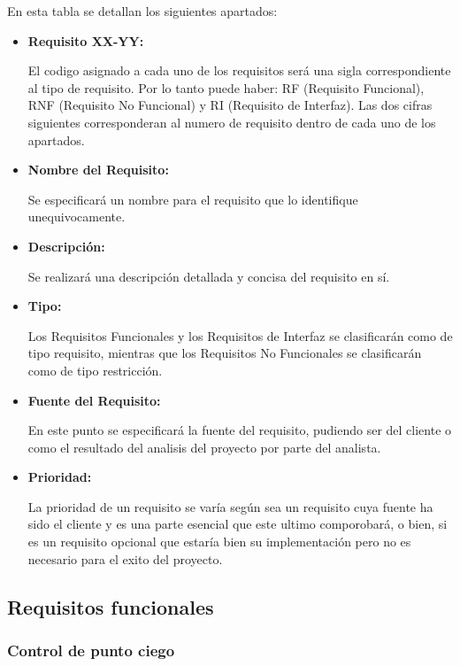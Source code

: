 \par En esta tabla se detallan los siguientes apartados:
\begin{itemize}[-]
\item \textbf{Requisito XX-YY: }
\par El codigo asignado a cada uno de los requisitos será una sigla correspondiente al tipo de requisito. Por lo tanto puede haber: RF (Requisito Funcional), RNF (Requisito No Funcional) y RI (Requisito de Interfaz). Las dos cifras siguientes corresponderan al numero de requisito dentro de cada uno de los apartados.
\item \textbf{Nombre del Requisito: }
\par Se especificará un nombre para el requisito que lo identifique unequivocamente.
\item \textbf{Descripción: }
\par Se realizará una descripción detallada y concisa del requisito en sí.
\item \textbf{Tipo: }
\par Los Requisitos Funcionales y los Requisitos de Interfaz se clasificarán como de tipo requisito, mientras que los Requisitos No Funcionales se clasificarán como de tipo restricción.
\item \textbf{Fuente del Requisito: }
\par En este punto se especificará la fuente del requisito, pudiendo ser del cliente o como el resultado del analisis del proyecto por parte del analista.
\item \textbf{Prioridad: }
\par La prioridad de un requisito se varía según sea un requisito cuya fuente ha sido el cliente y es una parte esencial que este ultimo comporobará, o bien, si es un requisito opcional que estaría bien su implementación pero no es necesario para el exito del proyecto.
\end{itemize}

\newpage

\subsection{Requisitos funcionales}


\subsubsection{Control de punto ciego}

